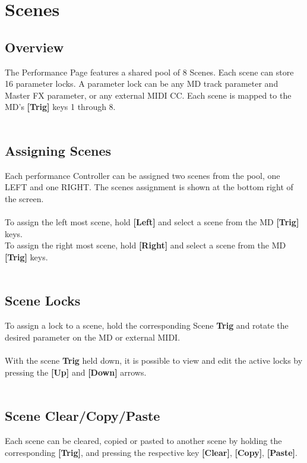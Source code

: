 \section{Scenes}
\subsection{Overview}
The Performance Page features a shared pool of 8 Scenes. Each scene can store 16 parameter locks. A parameter lock can be any MD track parameter and Master FX parameter, or any external MIDI CC. Each scene is mapped to the MD's \textbf{[Trig]} keys 1 through 8.\\\\
\subsection{Assigning Scenes}
Each performance Controller can be assigned two scenes from the pool, one LEFT and one RIGHT. The scenes assignment is shown at the bottom right of the screen.\\\\
To assign the left most scene, hold \textbf{[Left]} and select a scene from the MD \textbf{[Trig]} keys.\\
To assign the right most scene, hold \textbf{[Right]} and select a scene from the MD \textbf{[Trig]} keys.\\\\
\subsection{Scene Locks}

To assign a lock to a scene, hold the corresponding Scene \textbf{Trig} and rotate the desired parameter on the MD or external MIDI.\\\\
With the scene \textbf{Trig} held down, it is possible to view and edit the active locks by pressing the \textbf{[Up]} and \textbf{[Down]} arrows.
\\\\
\subsection{Scene Clear/Copy/Paste}
Each scene can be cleared, copied or pasted to another scene by holding the corresponding \textbf{[Trig]}, and pressing the respective key \textbf{[Clear]}, \textbf{[Copy]}, \textbf{[Paste]}.\\\\
